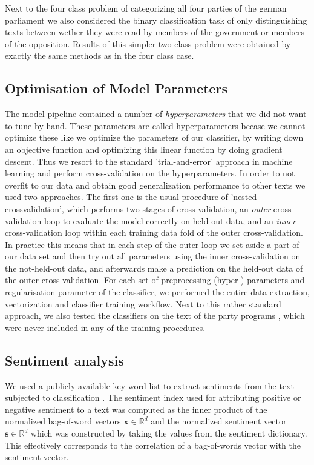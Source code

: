 \documentclass{article} %
\renewcommand{\vec}[1]{\mathbf{#1}}
\newcommand{\R}{\ensuremath{\mathds{R}}}
\begin{document}
Next to the four class problem of categorizing all four parties of the german parliament we also considered the binary classification task of only distinguishing texts between wether they were read by members of the government or members of the opposition. Results of this simpler two-class problem were obtained by exactly the same methods as in the four class case. 

\subsection{Optimisation of Model Parameters}\label{sec:crossvalidation}
The model pipeline contained a number of {\em hyperparameters} that we did not want to tune by hand. These parameters are called hyperparameters becase we cannot optimize these like we optimize the parameters of our classifier, by writing down an objective function and optimizing this linear function by doing gradient descent. Thus we resort to the standard 'trial-and-error' approach in machine learning and perform cross-validation on the hyperparameters. In order to not overfit to our data and obtain good generalization performance to other texts we used two approaches. The first one is the usual procedure of 'nested-crossvalidation', which performs two stages of cross-validation, an {\em outer} cross-validation loop to evaluate the model correctly on held-out data, and an {\em inner} cross-validation loop within each training data fold of the outer cross-validation. In practice this means that in each step of the outer loop we set aside a part of our data set and then try out all parameters using the inner cross-validation on the not-held-out data, and afterwards make a prediction on the held-out data of the outer cross-validation. For each set of preprocessing (hyper-) parameters and regularisation parameter of the classifier, we performed the entire data extraction, vectorization and classifier training workflow. Next to this rather standard approach, we also tested the classifiers on the text of the party programs \cite{linke_parteiprogramm, gruene_parteiprogramm,spd_parteiprogramm, cdu_parteiprogramm}, which were never included in any of the training procedures.

\subsection{Sentiment analysis}
We used a publicly available key word list to extract sentiments from the text subjected to classification \cite{remquahey2010}. The sentiment index used for attributing positive or negative sentiment to a text was computed  as the inner product of the normalized bag-of-word vectors $\vec{x}\in\R^d$ and the normalized sentiment vector $\vec{s}\in\R^d$ which was constructed by taking the values from the sentiment dictionary. This effectively corresponds to the correlation of a bag-of-words vector with the sentiment vector.
\end{document}
